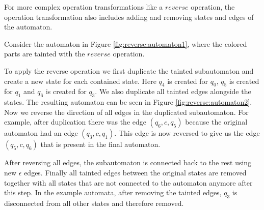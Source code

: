 For more complex operation transformations like a $reverse$ operation, the operation transformation also includes adding and removing states and edges of the automaton.

Consider the automaton in Figure \ref{fig:reverse:automaton1}, where the colored parts are tainted with the $reverse$ operation.

To apply the reverse operation we first duplicate the tainted subautomaton and create a new state for each contained state. Here $q_4$ is created for $q_0$, $q_5$ is created for $q_1$ and $q_6$ is created for $q_3$. We also duplicate all tainted edges alongside the states. The resulting automaton can be seen in Figure \ref{fig:reverse:automaton2}.
Now we reverse the direction of all edges in the duplicated subautomaton.
For example, after duplication there was the edge $(q_6, c, q_5)$ because the original automaton had an edge $(q_3,c,q_1)$. This edge is now reversed to give us the edge $(q_5, c, q_6)$ that is present in the final automaton.

After reversing all edges, the subautomaton is connected back to the rest using new $\epsilon$ edges.
Finally all tainted edges between the original states are removed together with all states that are not connected to the automaton anymore after this step.
In the example automata, after removing the tainted edges, $q_3$ is disconnected from all other states and therefore removed.

